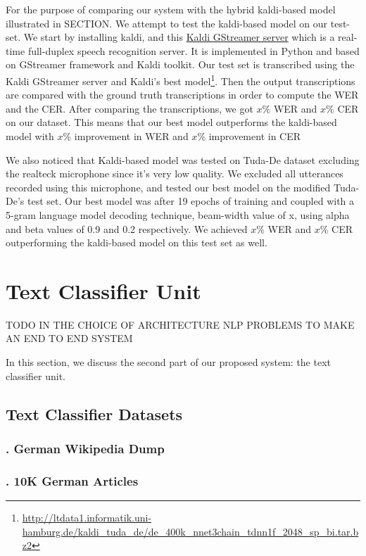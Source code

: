 
For the purpose of comparing our system with the hybrid kaldi-based model \cite{milde2018open} illustrated in SECTION. We attempt to test the kaldi-based model on our test-set. We start by installing kaldi, and this \href{https://github.com/alumae/kaldi-gstreamer-server}{Kaldi GStreamer server} which is a real-time full-duplex speech recognition server. It is implemented in Python and based on GStreamer framework and Kaldi toolkit. Our test set is transcribed using the Kaldi GStreamer server and Kaldi's best model\footnote{\url{http://ltdata1.informatik.uni-hamburg.de/kaldi_tuda_de/de_400k_nnet3chain_tdnn1f_2048_sp_bi.tar.bz2}}. Then the output transcriptions are compared with the ground truth transcriptions in order to compute the \ac{WER} and the \ac{CER}. After comparing the transcriptions, we got $x\%$ \ac{WER} and  $x\%$ \ac{CER} on our dataset. This means that our best model outperforms the kaldi-based model with $x\%$ improvement in \ac{WER} and $x\%$ improvement in \ac{CER}

We also noticed that Kaldi-based model was tested on Tuda-De dataset excluding the realteck microphone since it's very low quality. We excluded all utterances recorded using this microphone, and tested our best model on the modified Tuda-De's test set. Our best model was after 19 epochs of training and coupled with a 5-gram language model decoding technique, beam-width value of x, using alpha and beta values of 0.9 and 0.2 respectively. We achieved $x\%$ \ac{WER} and $x\%$ \ac{CER} outperforming the kaldi-based model on this test set as well.



\section{Text Classifier Unit} 
\label{meth:s3}

TODO IN THE CHOICE OF ARCHITECTURE NLP PROBLEMS TO MAKE AN END TO END SYSTEM

In this section, we discuss the second part of our proposed system: the text classifier unit. 

\subsection{Text Classifier Datasets}
\label{meth:sub2}

\subsubsection{. German Wikipedia Dump}
\label{meth:subsub4}
\subsubsection{. 10K German Articles}
\label{meth:subsub5}

